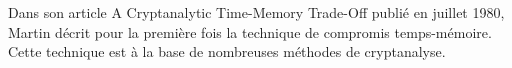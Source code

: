 
	Dans son article \og{}A Cryptanalytic Time-Memory Trade-Off\fg{}\cite{ehellman} publié en juillet 1980, Martin  décrit pour la première fois la technique de compromis temps-mémoire. Cette technique est à la base de nombreuses méthodes de cryptanalyse.



\endinput{}
